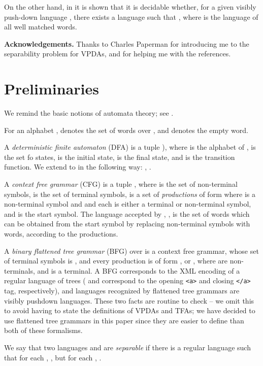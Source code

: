 \documentclass{article}
\begin{document}
On the other hand, in \cite{regvis} it is shown that it is decidable whether,
for a given visibly push-down language , there exists a language  such that
, where  is the language of all well matched words.

{\bf Acknowledgements.} Thanks to Charles Paperman for introducing me to
the separability problem for VPDAs, and for helping me with the references.

\section{Preliminaries}

We remind the basic notions of automata theory;  see \cite{hu79}.

For an alphabet ,  denotes the set of words over , and
 denotes the empty word.

A \emph{deterministic finite automaton} (DFA) is a tuple ),
where  is the alphabet of ,  is the set fo states,  is the
initial state,  is the final state, and 
is the transition function. We extend  to 
in the following way: , .

A \emph{context free grammar} (CFG) is a tuple , where  is the
set of non-terminal symbols,  is the set of terminal symbols,  is a set
of \emph{productions} of form  where  is a non-terminal symbol
and and each  is either a terminal or non-terminal symbol, and  is
the start symbol. The language accepted by , , is the set of
words which can be obtained from the start symbol  by replacing non-terminal symbols
with words, according to the productions.

A \emph{binary flattened tree grammar} (BFG) over  is a context free grammar, whose
set of terminal symbols is , and every production is 
of form ,  or , where 
 are non-terminals, and  is a terminal.
A BFG corresponds to the XML encoding of a 
regular language of trees ( and  correspond to the opening 
\verb:<a>: and closing \verb:</a>: tag, respectively), and languages recognized by
flattened tree grammars are visibly pushdown languages. These two facts are routine
to check -- we omit this to avoid having
to state the definitions of VPDAs and TFAs; we have decided to use flattened tree
grammars in this paper since they are easier to define than both of these formalisms.

\begin{definition}
We say that two languages  and  are \emph{separable} if there is a 
regular language  such that for each , ,
but for each , .
\end{definition}
\end{document}
